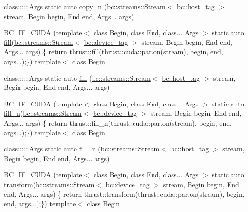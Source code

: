 \begin{DoxyCompactItemize}
\item 
class\+::::::\+Args static auto \hyperlink{namespacebc_1_1algorithms_a597f05cc11712b045091b2ae51de5414}{copy\+\_\+n} (\hyperlink{classbc_1_1streams_1_1Stream}{bc\+::streams\+::\+Stream}$<$ \hyperlink{structbc_1_1host__tag}{bc\+::host\+\_\+tag} $>$ stream, Begin begin, End end, Args... args)
\item 
\hyperlink{namespacebc_1_1algorithms_a6cf62203967e416b6c0e90403797c478}{B\+C\+\_\+\+I\+F\+\_\+\+C\+U\+DA} (template$<$ class Begin, class End, class... Args $>$ static auto \hyperlink{namespacebc_1_1algorithms_a0e18d09bd76be25a93a20e9e0a2f07a9}{fill}(\hyperlink{classbc_1_1streams_1_1Stream}{bc\+::streams\+::\+Stream}$<$ \hyperlink{structbc_1_1device__tag}{bc\+::device\+\_\+tag} $>$ stream, Begin begin, End end, Args... args) \{ return \hyperlink{tensor__iteralgos_8h_afd10a40f252abd24d1faa2752becdd53}{thrust\+::fill}(thrust\+::cuda\+::par.\+on(stream), begin, end, args...);\}) template$<$ class Begin
\item 
class\+::::::\+Args static auto \hyperlink{namespacebc_1_1algorithms_a0e18d09bd76be25a93a20e9e0a2f07a9}{fill} (\hyperlink{classbc_1_1streams_1_1Stream}{bc\+::streams\+::\+Stream}$<$ \hyperlink{structbc_1_1host__tag}{bc\+::host\+\_\+tag} $>$ stream, Begin begin, End end, Args... args)
\item 
\hyperlink{namespacebc_1_1algorithms_ace471eaeb93b9d31899320949f0dea7e}{B\+C\+\_\+\+I\+F\+\_\+\+C\+U\+DA} (template$<$ class Begin, class End, class... Args $>$ static auto \hyperlink{namespacebc_1_1algorithms_aac60a867fc181d8dde75d4198a4f3e5d}{fill\+\_\+n}(\hyperlink{classbc_1_1streams_1_1Stream}{bc\+::streams\+::\+Stream}$<$ \hyperlink{structbc_1_1device__tag}{bc\+::device\+\_\+tag} $>$ stream, Begin begin, End end, Args... args) \{ return thrust\+::fill\+\_\+n(thrust\+::cuda\+::par.\+on(stream), begin, end, args...);\}) template$<$ class Begin
\item 
class\+::::::\+Args static auto \hyperlink{namespacebc_1_1algorithms_aac60a867fc181d8dde75d4198a4f3e5d}{fill\+\_\+n} (\hyperlink{classbc_1_1streams_1_1Stream}{bc\+::streams\+::\+Stream}$<$ \hyperlink{structbc_1_1host__tag}{bc\+::host\+\_\+tag} $>$ stream, Begin begin, End end, Args... args)
\item 
\hyperlink{namespacebc_1_1algorithms_abc433ba5300c35144928062a6adad131}{B\+C\+\_\+\+I\+F\+\_\+\+C\+U\+DA} (template$<$ class Begin, class End, class... Args $>$ static auto \hyperlink{namespacebc_1_1algorithms_a56a3d18b6c2d6ece7a0b06c2583032d2}{transform}(\hyperlink{classbc_1_1streams_1_1Stream}{bc\+::streams\+::\+Stream}$<$ \hyperlink{structbc_1_1device__tag}{bc\+::device\+\_\+tag} $>$ stream, Begin begin, End end, Args... args) \{ return thrust\+::transform(thrust\+::cuda\+::par.\+on(stream), begin, end, args...);\}) template$<$ class Begin

\end{DoxyCompactItemize}
